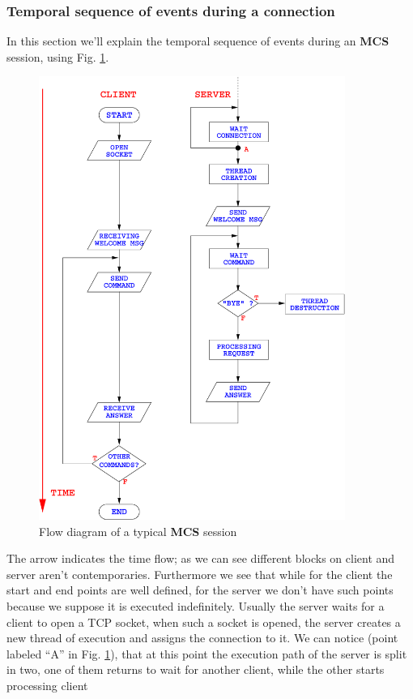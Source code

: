 \documentclass[12pt,titlepage]{article}
\newcommand{\mcs}{\textbf{MCS} }
\begin{document}
\subsubsection{Temporal sequence of events during a connection}
In this section we'll explain the temporal sequence of events during an
\mcs session, using Fig. \ref{flow}.
%
\begin{figure}[hbtp]
\begin{center}
\includegraphics[width=10cm,keepaspectratio]{includes/flow}
\end{center}
\caption{Flow diagram of a typical \mcs session}
\label{flow}
\end{figure}
%
The arrow indicates the time flow; as we can see different
blocks on client and server aren't contemporaries. Furthermore we see
that while for the client the start and end points are well defined,
for the server we don't have such points because we suppose it is
executed indefinitely. Usually the server waits for a client to open a
TCP socket, when such a socket is opened, the server creates a new
thread of execution and assigns the connection to it. We can notice
(point labeled ``A'' in Fig. \ref{flow}), that at this point the
execution path of the server is split in two, one of them returns
to wait for another client, while the other starts processing client
\end{document}
